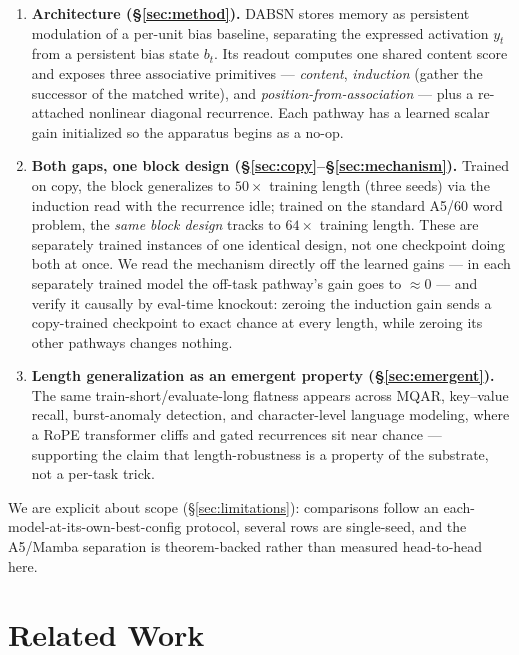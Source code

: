\documentclass[11pt]{article}
\newcommand{\model}{DABSN}
\begin{document}
\begin{enumerate}
\item \textbf{Architecture (\S\ref{sec:method}).} \model{} stores memory as
persistent modulation of a per-unit bias baseline, separating the expressed
activation $y_t$ from a persistent bias state $b_t$. Its readout computes one
shared content score and exposes three associative primitives ---
\emph{content}, \emph{induction} (gather the successor of the matched write),
and \emph{position-from-association} --- plus a re-attached nonlinear diagonal
recurrence. Each pathway has a learned scalar gain initialized so the
apparatus begins as a no-op.

\item \textbf{Both gaps, one block design
(\S\ref{sec:copy}--\S\ref{sec:mechanism}).} Trained on copy, the block
generalizes to $50\times$ training length (three seeds) via the induction read
with the recurrence idle; trained on the standard A5/60 word problem, the
\emph{same block design} tracks to $64\times$ training length. These are separately
trained instances of one identical design, not one checkpoint doing both at
once. We read the mechanism directly off the learned gains --- in each
separately trained model the off-task pathway's gain goes to $\approx 0$ ---
and verify it causally by eval-time knockout: zeroing the induction gain
sends a copy-trained checkpoint to exact chance at every length, while
zeroing its other pathways changes nothing.

\item \textbf{Length generalization as an emergent property
(\S\ref{sec:emergent}).} The same train-short/evaluate-long flatness appears
across MQAR, key--value recall, burst-anomaly detection, and character-level
language modeling, where a RoPE transformer cliffs and gated recurrences sit
near chance --- supporting the claim that length-robustness is a property of
the substrate, not a per-task trick.
\end{enumerate}

We are explicit about scope (\S\ref{sec:limitations}): comparisons follow an
each-model-at-its-own-best-config protocol, several rows are single-seed, and
the A5/Mamba separation is theorem-backed rather than measured head-to-head
here.

\section{Related Work}
\end{document}
